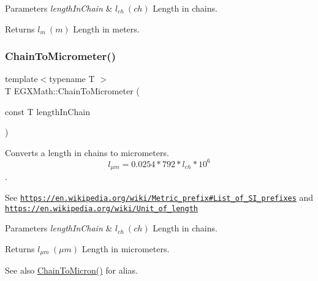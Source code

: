 \begin{DoxyParams}{Parameters}
{\em length\+In\+Chain} & $ l_{ch}\ (ch)$ Length in chains. \\
\hline
\end{DoxyParams}
\begin{DoxyReturn}{Returns}
$ l_{m}\ (m)$ Length in meters. 
\end{DoxyReturn}
\mbox{\label{group___e_g_x_math-_conversions-_length_conversions-_surveyors-_chain-_s_i_gab6d1ab0738e0a31f328352569fa00767}} 
\subsubsection{\texorpdfstring{Chain\+To\+Micrometer()}{ChainToMicrometer()}}
{\footnotesize\ttfamily template$<$typename T $>$ \\
T E\+G\+X\+Math\+::\+Chain\+To\+Micrometer (\begin{DoxyParamCaption}\item[{const T}]{length\+In\+Chain }\end{DoxyParamCaption})}



Converts a length in chains to micrometers. \[ l_{\mu m}=0.0254 * 792 * l_{ch} * 10^{6} \]. 

See \href{https://en.wikipedia.org/wiki/Metric_prefix#List_of_SI_prefixes}{\tt https\+://en.\+wikipedia.\+org/wiki/\+Metric\+\_\+prefix\#\+List\+\_\+of\+\_\+\+S\+I\+\_\+prefixes} and \href{https://en.wikipedia.org/wiki/Unit_of_length}{\tt https\+://en.\+wikipedia.\+org/wiki/\+Unit\+\_\+of\+\_\+length} 
\begin{DoxyParams}{Parameters}
{\em length\+In\+Chain} & $ l_{ch}\ (ch)$ Length in chains. \\
\hline
\end{DoxyParams}
\begin{DoxyReturn}{Returns}
$ l_{\mu m}\ (\mu m)$ Length in micrometers. 
\end{DoxyReturn}
\begin{DoxySeeAlso}{See also}
\mbox{\hyperlink{group___e_g_x_math-_conversions-_length_conversions-_surveyors-_chain-_non-_s_i_ga9efe9ceb0ab30639026cbb4158bb0148}{Chain\+To\+Micron()}} for alias. 
\end{DoxySeeAlso}
\mbox{\label{group___e_g_x_math-_conversions-_length_conversions-_surveyors-_chain-_s_i_gab2a17c49dbe6d8ec546e8819de2df33b}} 
